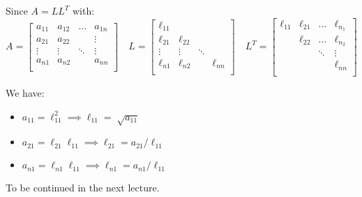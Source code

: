 \documentclass[../main/main.tex]{subfiles}
\begin{document}
    Since $A = L L^{T}$ with: \[
      A=
\begin{bmatrix}
a_{11} &a_{12}&\ldots&a_{1n} \\
a_{21} &a_{22}&&\vdots \\
\vdots &\vdots&\ddots& \vdots\\
a_{n1} &a_{n2}&&a_{nn} \\
\end{bmatrix}
\quad L = \begin{bmatrix}
\ell_{11} &&& \\
\ell_{21} &\ell_{22}&& \\
\vdots &\vdots&\ddots& \\
\ell_{n1} &\ell_{n2}&&\ell_{nn} \\
      \end{bmatrix}
      \quad
L^{T} =  \begin{bmatrix}
\ell_{11} &\ell_{21}&\ldots& \ell_{n_1} \\
 &\ell_{22}&\ldots&\ell_{n_2} \\
&&\ddots&\vdots \\
 &&&\ell_{nn} \\
\end{bmatrix}
    \]

    We have:
    \begin{itemize}
\item $a_{11} = \ell_{11}^2 \implies \ell_{11} = \sqrt[]{a_{11}}$
            \item $a_{21}= \ell_{21}\ell_{11} \implies \ell_{21} = a_{21} / \ell_{11}$
            \item $a_{n1}= \ell_{n1}\ell_{11} \implies \ell_{n1} = a_{n1} / \ell_{11}$
    \end{itemize}
To be continued in the next lecture.
\end{document}
